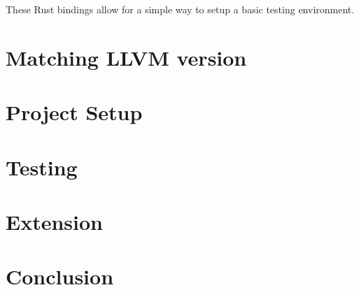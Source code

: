 \documentclass{report}
\begin{document}
These Rust bindings allow for a simple way to setup a basic testing environment.

\chapter {Matching LLVM version}

\chapter {Project Setup}

\chapter {Testing}
\chapter {Extension}
\chapter {Conclusion}
\end{document}
